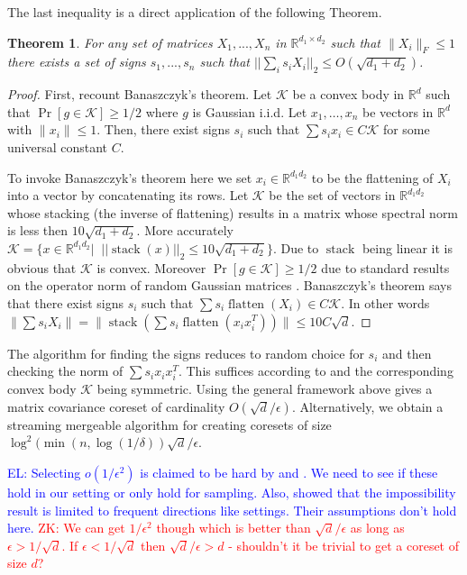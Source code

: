 \documentclass{article} %
\newtheorem{theorem}{Theorem}[section]
\newcommand{\zk}[1]{\textcolor{red}{ZK: #1}}
\newcommand{\el}[1]{\textcolor{blue}{EL: #1}}
\newcommand{\R}{\mathbb{R}}
\newcommand{\eps}{\epsilon}
\begin{document}
\noindent The last inequality is a direct application of the following Theorem.
\begin{theorem}\label{BansalInDaHouz}
For any set of matrices $X_1,...,X_n$ in $\R^{d_1 \times d_2}$ such that $\|X_i\|_{F} \le 1$ there exists a set of signs $s_1,...,s_n$ such that $||\sum_i s_i X_i||_{2} \le O(\sqrt{d_1 + d_2})$.
\end{theorem}
\begin{proof}
First, recount Banaszczyk's theorem. 
Let $\mathcal K$ be a convex body in $\R^d$ such that $\Pr[g \in \mathcal K] \ge 1/2$ where $g$ is Gaussian i.i.d.
Let $x_1,\ldots,x_n$ be vectors in $\R^d$ with $\|x_i\| \le 1$. 
Then, there exist signs $s_i$ such that $\sum s_i x_i \in C \mathcal K$ for some universal constant $C$.

To invoke Banaszczyk's theorem here we set $x_i \in \R^{d_1d_2}$ to be the flattening of $X_i$ into a vector by concatenating its rows. 
Let $\mathcal K$ be the set of vectors in $\R^{d_1d_2}$ whose stacking (the inverse of flattening) results in a matrix whose spectral norm is less then $10\sqrt{d_1 + d_2}$.
More accurately $\mathcal K = \{x  \in \R^{d_1d_2} |\;\; ||\operatorname{stack}(x)||_2 \le 10\sqrt{d_1+d_2}\}$. 
Due to $\operatorname{stack}$ being linear it is obvious that $\mathcal K$ is convex. 
Moreover $\Pr[g \in \mathcal K] \ge 1/2$ due to standard results on the operator norm of random Gaussian matrices \cite{}.
Banaszczyk's theorem says that there exist signs $s_i$ such that $\sum s_i \operatorname{flatten}(X_i) \in C \mathcal K$.
In other words $\| \sum s_i X_i\| = \| \operatorname{stack}( \sum s_i \operatorname{flatten}(x_i x_i^T)) \| \le 10 C \sqrt{d}$. 
\end{proof}
The algorithm for finding the signs reduces to random choice for $s_i$ and then checking the norm of $\sum s_i x_i x_i^T$.
This suffices according to \cite{DBLP:conf/approx/DadushGLN16} and the corresponding convex body $\mathcal K$ being symmetric.
Using the general framework above gives a matrix covariance coreset of cardinality $O(\sqrt{d}/\eps)$.
Alternatively, we obtain a streaming mergeable algorithm for creating coresets of size $\log^{2}(\min(n, \log(1/\delta)) \sqrt{d}/\eps$.



\el{Selecting $o(1/\eps^2)$ is claimed to be hard by \cite{DBLP:conf/focs/DeshpandeR10} and \cite{DBLP:conf/soda/DeshpandeRVW06}. We need to see if these hold in our setting or only hold for sampling.  Also, \cite{DBLP:conf/soda/GhashamiP14} showed that the impossibility result is limited to frequent directions like settings. Their assumptions don't hold here.} \zk{We can get $1/\eps^2$ though which is better than $\sqrt{d}/\eps$ as long as $\eps > 1/\sqrt{d}$. If $\eps < 1/\sqrt{d}$ then $\sqrt{d}/\eps > d$ - shouldn't it be trivial to get a coreset of size $d$?}
\end{document}
